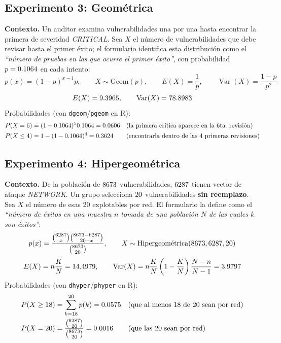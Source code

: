\documentclass[11pt,a4paper]{article}
\newcommand{\FP}{\text{[F]}}
\begin{document}
\subsection{Experimento 3: Geométrica}
\textbf{Contexto.} Un auditor examina vulnerabilidades una por una hasta
encontrar la primera de severidad \emph{CRITICAL}. Sea $X$ el número de
vulnerabilidades que debe revisar hasta el primer éxito; el formulario
\FP identifica esta distribución como el \emph{``número de pruebas en las que
ocurre el primer éxito''}, con probabilidad $p=0.1064$ en cada intento:
\[
p(x) = (1-p)^{x-1}p,\qquad
X \sim \text{Geom}(p),\qquad
E(X)=\frac{1}{p},\qquad
\operatorname{Var}(X)=\frac{1-p}{p^{2}}
\]
\[
E(X) = 9.3965,
\qquad
\operatorname{Var}(X) = 78.8983
\]
Probabilidades (con \texttt{dgeom}/\texttt{pgeom} en R):
\begin{align*}
P(X=6)     &= (1-0.1064)^{5}0.1064 = 0.0606
   &&\text{(la primera crítica aparece en la 6ta.\ revisión)}\\
P(X\leq 4) &= 1-(1-0.1064)^{4} = 0.3624
   &&\text{(encontrarla dentro de las 4 primeras revisiones)}
\end{align*}

\subsection{Experimento 4: Hipergeométrica}
\textbf{Contexto.} De la población de $8673$ vulnerabilidades,
$6287$ tienen vector de ataque \emph{NETWORK}. Un grupo selecciona
$20$ vulnerabilidades \textbf{sin reemplazo}. Sea $X$ el número de esas
20 explotables por red. El formulario la define como el \emph{``número de
éxitos en una muestra $n$ tomada de una población $N$ de las cuales $k$ son
éxitos''}:
\[
p(x) = \frac{\binom{6287}{x}\binom{8673-6287}{20-x}}{\binom{8673}{20}},
\qquad
X \sim \text{Hipergeométrica}(8673,6287,20)
\]
\[
E(X) = n\frac{K}{N} = 14.4979,
\qquad
\operatorname{Var}(X)= n\frac{K}{N}\left(1-\frac{K}{N}\right)\frac{N-n}{N-1} = 3.9797
\]
Probabilidades (con \texttt{dhyper}/\texttt{phyper} en R):
\begin{align*}
P(X\geq 18) &= \sum_{k=18}^{20} p(k) = 0.0575
   &&\text{(que al menos 18 de 20 sean por red)}\\
P(X=20) &= \frac{\binom{6287}{20}}{\binom{8673}{20}} = 0.0016
   &&\text{(que las 20 sean por red)}
\end{align*}
\end{document}
